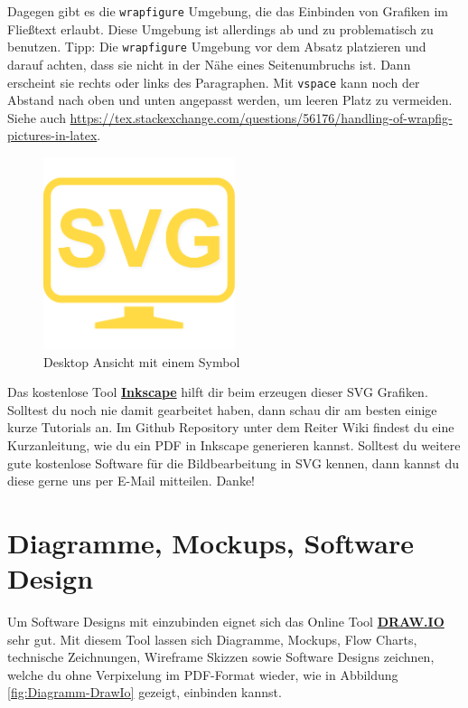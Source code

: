 Dagegen gibt es die \texttt{wrapfigure} Umgebung, die das Einbinden von Grafiken im Fließtext erlaubt.
Diese Umgebung ist allerdings ab und zu problematisch zu benutzen.
Tipp: Die \texttt{wrapfigure} Umgebung vor dem Absatz platzieren und darauf achten, dass sie nicht in der Nähe eines Seitenumbruchs ist.
Dann erscheint sie rechts oder links des Paragraphen. Mit \texttt{vspace} kann noch der Abstand nach oben und unten angepasst werden, um leeren Platz zu vermeiden.
Siehe auch \url{https://tex.stackexchange.com/questions/56176/handling-of-wrapfig-pictures-in-latex}.

\begin{figure}[ht]
	\centering
	\includegraphics[width=0.50\textwidth]{content/08_instructions/images/desktop-screen.pdf} 
	\caption{Desktop Ansicht mit einem Symbol}
	\label{fig:Referenz-auf-Bild}
\end{figure}

Das kostenlose Tool \href{https://inkscape.org/}{\textbf{Inkscape}} hilft dir beim erzeugen dieser SVG Grafiken. Solltest du noch nie damit gearbeitet haben, dann schau dir am besten einige kurze Tutorials an. Im Github Repository unter dem Reiter Wiki findest du eine Kurzanleitung, wie du ein PDF in Inkscape generieren kannst. Solltest du weitere gute kostenlose Software für die Bildbearbeitung in SVG kennen, dann kannst du diese gerne uns per E-Mail mitteilen. Danke!

\section{Diagramme, Mockups, Software Design}

Um Software Designs mit einzubinden eignet sich das Online Tool \textbf{\href{https://www.draw.io/}{DRAW.IO}} sehr gut. Mit diesem Tool lassen sich Diagramme, Mockups, Flow Charts, technische Zeichnungen, Wireframe Skizzen sowie Software Designs zeichnen, welche du ohne Verpixelung im PDF-Format wieder, wie in Abbildung \ref{fig:Diagramm-DrawIo} gezeigt, einbinden kannst.

